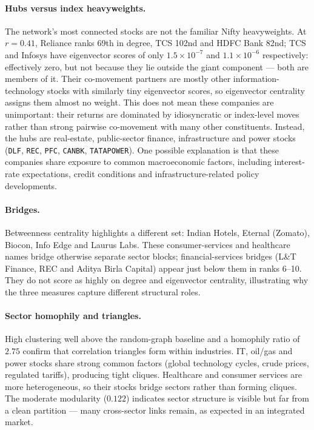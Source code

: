 \documentclass[11pt,a4paper]{article}
\begin{document}
\paragraph{Hubs versus index heavyweights.}
The network's most connected stocks are not the familiar Nifty heavyweights.
At $r=0.41$, Reliance ranks 69th in degree, TCS 102nd and HDFC Bank 82nd;
TCS and Infosys have eigenvector scores of only $1.5\times10^{-7}$ and
$1.1\times10^{-6}$ respectively: effectively zero, but not because they lie
outside the giant component --- both are members of it. Their co-movement
partners are mostly other information-technology stocks with similarly tiny
eigenvector scores, so eigenvector centrality assigns them almost no weight.
This does not mean these companies are unimportant: their returns are dominated
by idiosyncratic or index-level moves rather than strong
pairwise co-movement with many other constituents. Instead, the hubs are
real-estate, public-sector finance, infrastructure and power stocks
(\texttt{DLF}, \texttt{REC}, \texttt{PFC}, \texttt{CANBK}, \texttt{TATAPOWER}). One possible explanation is that these companies share exposure to common macroeconomic factors, including interest-rate expectations, credit conditions and infrastructure-related policy developments.

\paragraph{Bridges.}
Betweenness centrality highlights a different set: Indian Hotels, Eternal
(Zomato), Biocon, Info Edge and Laurus Labs. These consumer-services and
healthcare names bridge otherwise separate sector blocks; financial-services
bridges (L\&T Finance, REC and Aditya Birla Capital) appear just below them in
ranks 6--10. They do not score as highly on degree and eigenvector
centrality, illustrating why the three measures capture different
structural roles.

\paragraph{Sector homophily and triangles.}
High clustering well above the random-graph baseline and a homophily ratio of
$2.75$ confirm that correlation triangles form within industries. IT, oil/gas
and power stocks share strong common factors (global technology cycles, crude
prices, regulated tariffs), producing tight cliques. Healthcare and consumer
services are more heterogeneous, so their stocks bridge sectors rather than
forming cliques. The moderate modularity ($0.122$) indicates sector structure
is visible but far from a clean partition --- many cross-sector links remain,
as expected in an integrated market.
\end{document}
